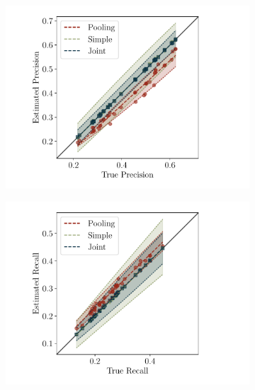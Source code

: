\begin{figure}[t]
  \centering
  \begin{subfigure}{0.30\textwidth}
    \includegraphics[width=\textwidth,trim={1.5cm 0 1.5cm 0},clip]{figures/simulation/simulation-p}
    \caption{}
  \end{subfigure}
  \begin{subfigure}{0.30\textwidth}
    \includegraphics[width=\textwidth,trim={1.5cm 0 1.5cm 0},clip]{figures/simulation/simulation-r}
    \caption{}
  \end{subfigure}
  \begin{subfigure}{0.30\textwidth}

\end{subfigure}
\end{figure}
